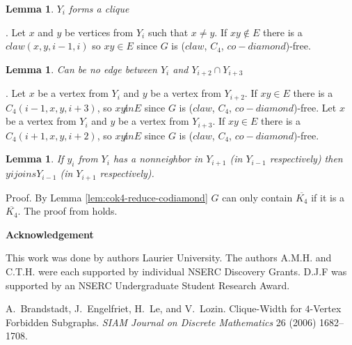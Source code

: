 \documentclass[12pt]{article}
\newtheorem{Lemma}[Theorem]{Lemma}
\def\CCD{($claw$, $C_4$, $co-diamond$)}
\begin{document}
\begin{Lemma}\label{lem:3K-clique}
$Y_i$ forms a clique
\end{Lemma}
. Let $x$ and $y$ be vertices from $Y_i$ such that $x \neq y$. If $xy \not \in E$ there is a $claw (x, y, i-1, i)$ so $xy \in E$ since $G$ is {\CCD}-free.

\begin{Lemma}\label{lem:yi-adjacency-yi2}
Can be no edge between $Y_i$ and $Y_{i+2} \cap Y_{i+3}$
\end{Lemma}
. Let $x$ be a vertex from $Y_i$ and $y$ be a vertex from $Y_{i+2}$. If $xy \in E$ there is a $C_4 (i-1, x, y, i+3)$, so $xy \not in E$ since $G$ is {\CCD}-free. Let $x$ be a vertex from $Y_i$ and $y$ be a vertex from $Y_{i+3}$. If $xy \in E$ there is a $C_4 (i+1, x, y, i+2)$, so $xy \not in E$ since $G$ is {\CCD}-free.

\begin{Lemma}\label{lem:yi-miss-two-neighbors}
If $y_i$ from $Y_i$ has a nonneighbor in $Y_{i+1}$ (in $Y_{i-1}$ respectively) then $yi joins Y_{i-1}$ (in $Y_{i+1}$ respectively).
\end{Lemma}
\noindent {\it} Proof. By Lemma \ref{lem:cok4-reduce-codiamond} $G$ can only contain $\overline{K_4}$ if it is a $\overline{K_4}$. The proof from \cite{BrEnLeLo} holds.



\begin{center}
{\bf Acknowledgement}
\end{center}
This work was done by authors  Laurier University. The authors A.M.H. and C.T.H. were each supported by individual NSERC Discovery Grants. D.J.F was supported by an NSERC Undergraduate Student Research Award.


\clearpage
\begin{thebibliography}{99}


    A.~Brandstadt, J.~Engelfriet, H.~Le, and V.~Lozin. Clique-Width for $4$-Vertex Forbidden Subgraphs.  {\sl SIAM
     Journal on Discrete Mathematics} 26 (2006) 1682--1708.

\end{thebibliography}
\end{document}
